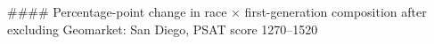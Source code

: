 #### Percentage-point change in race × first-generation composition after excluding Geomarket: San Diego, PSAT score 1270–1520
